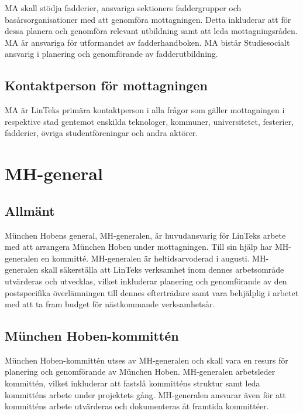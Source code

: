MA skall stödja fadderier, ansvariga sektioners faddergrupper och
basårsorganisationer med att genomföra mottagningen. Detta inkluderar
att för dessa planera och genomföra relevant utbildning samt att leda
mottagningsråden. MA är ansvariga för utformandet av fadderhandboken. MA
bistår Studiesocialt ansvarig i planering och genomförande av
fadderutbildning.

\hypertarget{kontaktperson-fuxf6r-mottagningen}{%
\subsection{Kontaktperson för
mottagningen}\label{kontaktperson-fuxf6r-mottagningen}}

MA är LinTeks primära kontaktperson i alla frågor som gäller
mottagningen i respektive stad gentemot enskilda teknologer, kommuner,
universitetet, festerier, fadderier, övriga studentföreningar och andra
aktörer.

\hypertarget{mh-general}{%
\section{MH-general}\label{mh-general}}

\hypertarget{allmuxe4nt-10}{%
\subsection{Allmänt}\label{allmuxe4nt-10}}

München Hobens general, MH-generalen, är huvudansvarig för LinTeks
arbete med att arrangera München Hoben under mottagningen. Till sin
hjälp har MH-generalen en kommitté. MH-generalen är heltidsarvoderad i
augusti. MH-generalen skall säkerställa att LinTeks verksamhet inom
dennes arbetsområde utvärderas och utvecklas, vilket inkluderar
planering och genomförande av den postspecifika överlämningen till
dennes efterträdare samt vara behjälplig i arbetet med att ta fram
budget för nästkommande verksamhetsår.

\hypertarget{muxfcnchen-hoben-kommittuxe9n}{%
\subsection{München
Hoben-kommittén}\label{muxfcnchen-hoben-kommittuxe9n}}

München Hoben-kommittén utses av MH-generalen och skall vara en resurs
för planering och genomförande av München Hoben. MH-generalen
arbetsleder kommittén, vilket inkluderar att fastslå kommitténs struktur
samt leda kommitténs arbete under projektets gång. MH-generalen ansvarar
även för att kommitténs arbete utvärderas och dokumenteras åt framtida
kommittéer.

